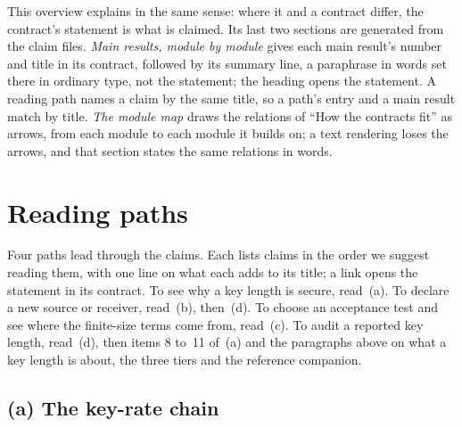 This overview explains in the same sense: where it and a contract differ, the
contract's statement is what is claimed. Its last two sections are generated
from the claim files. \emph{Main results, module by module} gives each main
result's number and title in its contract, followed by its summary line, a
paraphrase in words set there in ordinary type, not the statement; the
heading opens the statement. A reading path names a claim by the same title,
so a path's entry and a main result match by title. \emph{The module map}
draws the relations of ``How the contracts fit'' as arrows, from each module
to each module it builds on; a text rendering loses the arrows, and that
section states the same relations in words.

\section*{Reading paths}

Four paths lead through the claims. Each lists claims in the order we
suggest reading them, with one line on what each adds to its title; a link
opens the statement in its contract. To see why a key length is secure,
read~(a). To declare a new source or receiver, read~(b), then~(d). To choose
an acceptance test and see where the finite-size terms come from, read~(c).
To audit a reported key length, read~(d), then items 8 to~11 of~(a) and the
paragraphs above on what a key length is about, the three tiers and the
reference companion.

\subsection*{(a) The key-rate chain}

